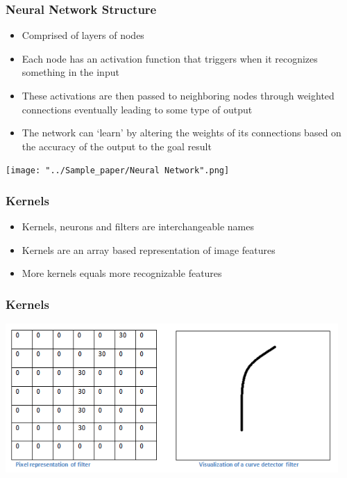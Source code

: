 \documentclass{beamer}
\begin{document}
\begin{frame}
  \frametitle{Neural Network Structure}
  \begin{itemize}
	\item Comprised of layers of nodes
	\item Each node has an activation function that triggers when it recognizes something in the input
	\item These activations are then passed to neighboring nodes through weighted connections eventually leading to some type of output
	\item The network can `learn' by altering the weights of its connections based on the accuracy of the output to the goal result
  \end{itemize}
\end{frame}

\begin{frame}
	\begin{center}
	  \texttt{[image: "../Sample\_paper/Neural Network".png]}
	\end{center}
\end{frame}

\begin{frame}
  \frametitle{Kernels}
  
  \begin{itemize}
	\item Kernels, neurons and filters are interchangeable names
	\item Kernels are an array based representation of image features
	\item More kernels equals more recognizable features
  \end{itemize}
  
\end{frame}

\begin{frame}
  \frametitle{Kernels}
   \includegraphics[width=0.95\textwidth]{Filter.png}
       \\
\end{frame}
\end{document}

